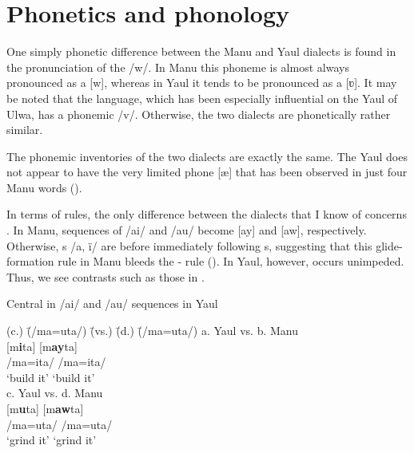 \section{\label{sec:18.3}  Phonetics and phonology}


One simply phonetic difference between the Manu and Yaul dialects is found in the pronunciation of the  /w/. In Manu this phoneme is almost always pronounced as a   [w], whereas in Yaul it tends to be pronounced as a   [ʋ]. It may be noted that the  language, which has been especially influential on the Yaul  of Ulwa, has a phonemic /v/. Otherwise, the two dialects are phonetically rather similar.

  The phonemic inventories of the two dialects are exactly the same. The Yaul  does not appear to have the very limited phone [æ] that has been observed in just four Manu  words ().

  In terms of  rules, the only difference between the dialects that I know of concerns . In Manu,  sequences of /ai/ and /au/ become [ay] and [aw], respectively. Otherwise, s /a, ï/ are  before immediately following s, suggesting that this glide-formation rule in Manu bleeds the - rule (). In Yaul, however,   occurs unimpeded. Thus, we see contrasts such as those in .



\ea%
    \label{ex:mdy:1}
            Central   in /ai/ and /au/ sequences in Yaul\\
\begin{tabbing}
{(c.)} \= {(/ma=uta/)} \= {(vs.)} \= {(d.)} \= {(/ma=uta/)}\kill
{a.} \> {Yaul} \> {vs.} \> {b.} \> {Manu}\\
{ } \> {[m\textbf{i}ta]} \> { } \> { } \> {[m\textbf{ay}ta]}\\
{ } \> {/ma=ita/} \> { } \> { } \> {/ma=ita/}\\
{ } \> {‘build it’} \> { } \> { } \> {‘build it’}\\
{c.} \> {Yaul} \> {vs.} \> {d.} \> {Manu}\\
{ } \> {[m\textbf{u}ta]} \> { } \> { } \> {[m\textbf{aw}ta]}\\
{ } \> {/ma=uta/} \> { } \> { } \> {/ma=uta/}\\
{ } \> {‘grind it’} \> { } \> { } \> {‘grind it’}
\end{tabbing}
\z


